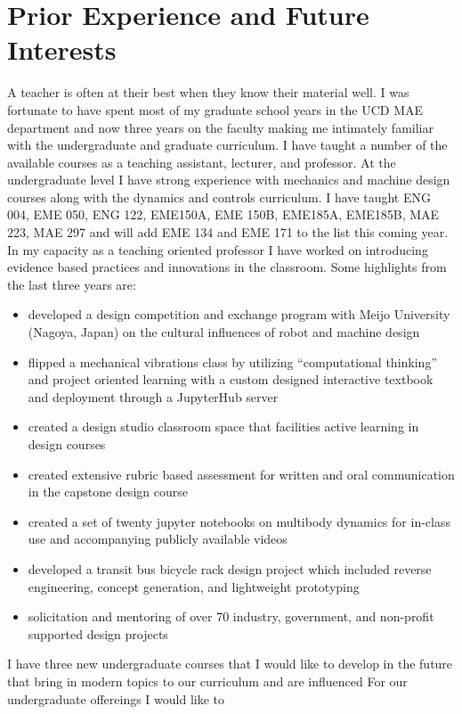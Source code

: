 \documentclass{article}
\begin{document}
\section*{Prior Experience and Future Interests}
%
A teacher is often at their best when they know their material well. I was fortunate
to have spent most of my graduate school years in the UCD MAE department and
now three years on the faculty making me intimately familiar with the
undergraduate and graduate curriculum. I have taught a number of the available
courses as a teaching assistant, lecturer, and professor. At the undergraduate
level I have strong experience with mechanics and machine design courses along
with the dynamics and controls curriculum. I have taught ENG 004, EME 050, ENG
122, EME150A, EME 150B, EME185A, EME185B, MAE 223, MAE 297 and will add EME 134
and EME 171 to the list this coming year. In my capacity as a teaching oriented
professor I have worked on introducing evidence based practices and innovations
in the classroom. Some highlights from the last three years are:

\begin{itemize}
  \item developed a design competition and exchange program with Meijo
    University (Nagoya, Japan) on the cultural influences of robot and machine
    design
  \item flipped a mechanical vibrations class by utilizing ``computational
    thinking'' and project oriented learning with a custom designed interactive
    textbook and deployment through a JupyterHub server
  \item created a design studio classroom space that facilities active learning
    in design courses
  \item created extensive rubric based assessment for written and oral
    communication in the capstone design course
  \item created a set of twenty jupyter notebooks on multibody dynamics for
    in-class use and accompanying publicly available videos
  \item developed a transit bus bicycle rack design project which included
    reverse engineering, concept generation, and lightweight prototyping
  \item solicitation and mentoring of over 70 industry, government, and
    non-profit supported design projects
\end{itemize}

I have three new undergraduate courses that I would like to develop in the
future that bring in modern topics to our curriculum and are influenced
For our undergraduate offereings I would like to 
\end{document}
